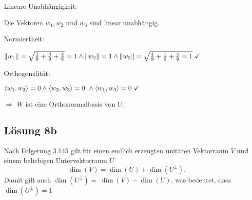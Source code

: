\documentclass[main.tex]{subfiles}
\begin{document}
Lineare Unabhängigkeit:

Die Vektoren $w_{1} ,w_{2}$ und $w_{3}$ sind linear unabhängig.

Normiertheit:

 $\left\|  w_{1}  \right\| =\sqrt{\frac{1}{9} +\frac{4}{9} +\frac{4}{9}} =1\land \left\|  w_{2}  \right\| =1\land \left\|  w_{3}  \right\| =\sqrt{\frac{4}{9} +\frac{1}{9} +\frac{4}{9} =1} \ \checkmark $

Orthogonalität:

$\scalarprod{ w_{1} ,w_{2}} =0\land \scalarprod{ w_{2} ,w_{3}} =0\ \land \scalarprod{ w_{1} ,w_{3}} =0\ \checked $



$\Rightarrow $ $W$ ist eine Orthonormalbasis von $U$.

\subsection{Lösung 8b}
Nach Folgerung 3.145 gilt für einen endlich erzeugten unitären Vektorraum $V$ und einem beliebigen Untervektorraum $U$
\begin{equation*}
    \dim( V) =\dim( U) +\dim\left( U^{\perp }\right).
\end{equation*}
Damit gilt auch $\dim\left( U^{\perp }\right) =\ \dim( V) -\dim( U)$, was bedeutet, dass $\dim\left( U^{\perp }\right) =1$
\end{document}
